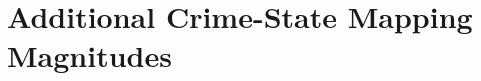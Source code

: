 \documentclass[applsci,supfile,submit,moreauthors]{Definitions/mdpi}
\begin{document}
\renewcommand{\thesection}{S\arabic{section}}
\renewcommand{\thefigure}{S\arabic{figure}}
\renewcommand{\thetable}{S\arabic{table}}
\renewcommand{\thetheorem}{S\arabic{theorem}}
\renewcommand{\theproposition}{S\arabic{proposition}}
\renewcommand{\thecorollary}{S\arabic{corollary}}
\renewcommand{\theremark}{S\arabic{remark}}
\renewcommand{\thelemma}{S\arabic{lemma}}
\setcounter{section}{0}
\setcounter{figure}{0}
\setcounter{table}{0}


\FloatBarrier

\FloatBarrier

\FloatBarrier
\section{Additional Crime-State Mapping Magnitudes}

\FloatBarrier
\end{document}
